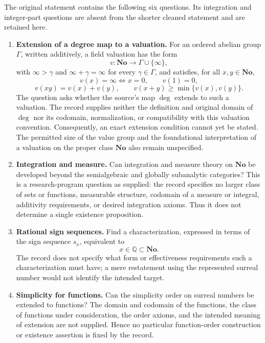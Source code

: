 \documentclass[11pt]{article}
\newcommand{\Q}{\mathbb{Q}}
\begin{document}
The original statement contains the following six questions. Its integration and integer-part questions are absent from the shorter cleaned statement and are retained here.
\begin{enumerate}
\item \textbf{Extension of a degree map to a valuation.} For an ordered abelian group \(\Gamma\), written additively, a field valuation has the form
\[
 v\colon\mathbf{No}\longrightarrow\Gamma\cup\{\infty\},
\]
with \(\infty>\gamma\) and \(\infty+\gamma=\infty\) for every \(\gamma\in\Gamma\), and satisfies, for all \(x,y\in\mathbf{No}\),
\[
 v(x)=\infty\iff x=0,\qquad v(1)=0,
\]
\[
 v(xy)=v(x)+v(y),\qquad
 v(x+y)\geq\min\{v(x),v(y)\}.
\]
The question asks whether the source's map \(\deg\) extends to such a valuation. The record supplies neither the definition and original domain of \(\deg\) nor its codomain, normalization, or compatibility with this valuation convention. Consequently, an exact extension condition cannot yet be stated. The permitted size of the value group and the foundational interpretation of a valuation on the proper class \(\mathbf{No}\) also remain unspecified.

\item \textbf{Integration and measure.} Can integration and measure theory on \(\mathbf{No}\) be developed beyond the semialgebraic and globally subanalytic categories? This is a research-program question as supplied: the record specifies no larger class of sets or functions, measurable structure, codomain of a measure or integral, additivity requirements, or desired integration axioms. Thus it does not determine a single existence proposition.

\item \textbf{Rational sign sequences.} Find a characterization, expressed in terms of the sign sequence \(s_x\), equivalent to
\[
 x\in\Q\subset\mathbf{No}.
\]
The record does not specify what form or effectiveness requirements such a characterization must have; a mere restatement using the represented surreal number would not identify the intended target.

\item \textbf{Simplicity for functions.} Can the simplicity order on surreal numbers be extended to functions? The domain and codomain of the functions, the class of functions under consideration, the order axioms, and the intended meaning of extension are not supplied. Hence no particular function-order construction or existence assertion is fixed by the record.


\end{enumerate}
\end{document}
